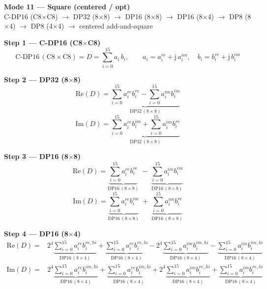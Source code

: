 \documentclass[fleqn]{article}
\newcommand{\DPop}[3]{\mathrm{DP#1}\,(#2\!\times\!#3)}
\begin{document}
\begin{center}
{\LARGE \textbf{Mode 11 --- Square (centered / opt)}}\\[4pt]
{\large C-DP16 (C8$\times$C8) $\rightarrow$ DP32 (8$\times$8) $\rightarrow$ DP16 (8$\times$8) $\rightarrow$ DP16 (8$\times$4) $\rightarrow$ DP8 (8$\times$4) $\rightarrow$ DP8 (4$\times$4) $\rightarrow$ centered add-and-square}
\end{center}

\vspace{0.1em}

\textbf{Step 1 --- C-DP16 (C8$\times$C8)}
\[
\text{C-DP16}\,(\mathrm{C8}\!\times\!\mathrm{C8}) = D = \sum_{i=0}^{15} a_i \, b_i, \qquad
a_i = a_i^{re} + \mathrm{j}\,a_i^{im}, \quad
b_i = b_i^{re} + \mathrm{j}\,b_i^{im}
\]

\textbf{Step 2 --- DP32 (8$\times$8)}
\[
\mathrm{Re}(D) = \underbrace{\sum_{i=0}^{15} a_i^{re} b_i^{re}
  - \sum_{i=0}^{15} a_i^{im} b_i^{im}}_{\DPop{32}{8}{8}}
\]
\[
\mathrm{Im}(D) = \underbrace{\sum_{i=0}^{15} a_i^{re} b_i^{im}
  + \sum_{i=0}^{15} a_i^{im} b_i^{re}}_{\DPop{32}{8}{8}}
\]

\textbf{Step 3 --- DP16 (8$\times$8)}
\[
\mathrm{Re}(D) = \underbrace{\sum_{i=0}^{15} a_i^{re} b_i^{re}}_{\DPop{16}{8}{8}}
  \; - \; \underbrace{\sum_{i=0}^{15} a_i^{im} b_i^{im}}_{\DPop{16}{8}{8}}
\]
\[
\mathrm{Im}(D) = \underbrace{\sum_{i=0}^{15} a_i^{re} b_i^{im}}_{\DPop{16}{8}{8}}
  \; + \; \underbrace{\sum_{i=0}^{15} a_i^{im} b_i^{re}}_{\DPop{16}{8}{8}}
\]

\textbf{Step 4 --- DP16 (8$\times$4)}
\begin{align*}
\mathrm{Re}(D) = {}
  & 2^{4} \underbrace{\sum_{i=0}^{15} a_i^{re} b_i^{re,hi}}_{\DPop{16}{8}{4}}
  + \underbrace{\sum_{i=0}^{15} a_i^{re} b_i^{re,lo}}_{\DPop{16}{8}{4}}
  - 2^{4} \underbrace{\sum_{i=0}^{15} a_i^{im} b_i^{im,hi}}_{\DPop{16}{8}{4}}
  - \underbrace{\sum_{i=0}^{15} a_i^{im} b_i^{im,lo}}_{\DPop{16}{8}{4}}
\end{align*}
\begin{align*}
\mathrm{Im}(D) = {}
  & 2^{4} \underbrace{\sum_{i=0}^{15} a_i^{re} b_i^{im,hi}}_{\DPop{16}{8}{4}}
  + \underbrace{\sum_{i=0}^{15} a_i^{re} b_i^{im,lo}}_{\DPop{16}{8}{4}}
  + 2^{4} \underbrace{\sum_{i=0}^{15} a_i^{im} b_i^{re,hi}}_{\DPop{16}{8}{4}}
  + \underbrace{\sum_{i=0}^{15} a_i^{im} b_i^{re,lo}}_{\DPop{16}{8}{4}}
\end{align*}
\end{document}
